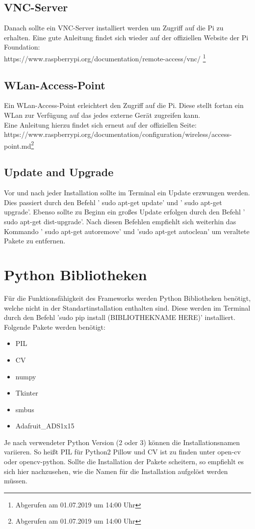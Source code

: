 \documentclass[twoside,11pt, a4paper]{report}
\begin{document}
	\subsection{VNC-Server}
	Danach sollte ein VNC-Server installiert werden um Zugriff auf die Pi zu erhalten. Eine gute Anleitung findet sich wieder auf der offiziellen Website der Pi Foundation:\\
	https://www.raspberrypi.org/documentation/remote-access/vnc/ \footnote{Abgerufen am 01.07.2019 um 14:00 Uhr}
	
	
	\subsection{WLan-Access-Point}
	Ein WLan-Access-Point erleichtert den Zugriff auf die Pi. Diese stellt fortan ein WLan zur Verfügung auf das jedes externe Gerät zugreifen kann. \\
	Eine Anleitung hierzu findet sich erneut auf der offiziellen Seite:\\
	https://www.raspberrypi.org/documentation/configuration/wireless/access-point.md\footnote{Abgerufen am 01.07.2019 um 14:00 Uhr}
	
	\subsection{Update and Upgrade}
	Vor und nach jeder Installation sollte im Terminal ein Update erzwungen werden. Dies passiert durch den Befehl ' sudo apt-get update' und ' sudo apt-get upgrade'. Ebenso sollte zu Beginn ein großes Update erfolgen durch den Befehl ' sudo apt-get dist-upgrade'. Nach diesen Befehlen empfiehlt sich weiterhin das Kommando ' sudo apt-get autoremove' und 'sudo apt-get autoclean' um veraltete Pakete zu entfernen. 
	
	\section{Python Bibliotheken}
	
	Für die Funktionsfähigkeit des Frameworks werden Python Bibliotheken benötigt, welche nicht in der Standartinstallation enthalten sind. Diese werden im Terminal durch den Befehl 'sudo pip install (BIBLIOTHEKNAME HERE)' installiert.\\
	Folgende Pakete werden benötigt: 
	\begin{center}
		\begin{itemize}
			\item PIL
			\item CV
			\item numpy
			\item Tkinter
			\item smbus
			\item Adafruit\_ADS1x15
		\end{itemize}
	\end{center}
	Je nach verwendeter Python Version (2 oder 3) können die Installationsnamen variieren. So heißt PIL für Python2 Pillow und CV ist zu finden unter open-cv oder opencv-python. Sollte die Installation der Pakete scheitern, so empfiehlt es sich hier nachzusehen, wie die Namen für die Installation aufgelöst werden müssen. 
	
\end{document}
